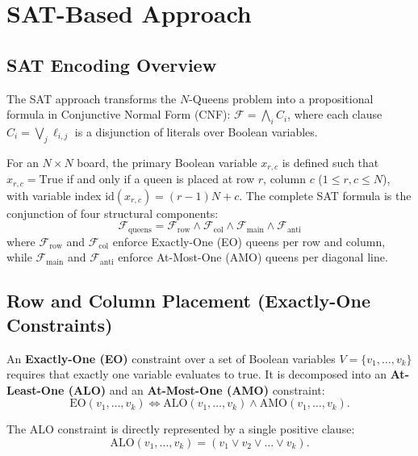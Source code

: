 \documentclass[a4paper,fleqn]{cas-sc}
\begin{document}
\section{SAT-Based Approach}
\label{sec:sat_approach}

\subsection{SAT Encoding Overview}

The SAT approach transforms the $N$-Queens problem into a propositional formula in Conjunctive Normal Form (CNF): $\mathcal{F} = \bigwedge_{i} C_i$, where each clause $C_i = \bigvee_{j} \ell_{i,j}$ is a disjunction of literals over Boolean variables. 

For an $N \times N$ board, the primary Boolean variable $x_{r,c}$ is defined such that $x_{r,c} = \text{True}$ if and only if a queen is placed at row $r$, column $c$ ($1 \le r, c \le N$), with variable index $\text{id}(x_{r,c}) = (r-1)N + c$. The complete SAT formula is the conjunction of four structural components:
\begin{equation}
    \mathcal{F}_{\text{queens}} = \mathcal{F}_{\text{row}} \wedge \mathcal{F}_{\text{col}} \wedge \mathcal{F}_{\text{main}} \wedge \mathcal{F}_{\text{anti}}
    \label{eq:sat_formula}
\end{equation}
where $\mathcal{F}_{\text{row}}$ and $\mathcal{F}_{\text{col}}$ enforce Exactly-One (EO) queens per row and column, while $\mathcal{F}_{\text{main}}$ and $\mathcal{F}_{\text{anti}}$ enforce At-Most-One (AMO) queens per diagonal line.

\subsection{Row and Column Placement (Exactly-One Constraints)}

An \textbf{Exactly-One (EO)} constraint over a set of Boolean variables $V = \{v_1, \ldots, v_k\}$ requires that exactly one variable evaluates to true. It is decomposed into an \textbf{At-Least-One (ALO)} and an \textbf{At-Most-One (AMO)} constraint:
\begin{equation}
    \text{EO}(v_1, \ldots, v_k) \iff \text{ALO}(v_1, \ldots, v_k) \wedge \text{AMO}(v_1, \ldots, v_k).
\end{equation}

The ALO constraint is directly represented by a single positive clause:
\begin{equation}
    \text{ALO}(v_1, \ldots, v_k) = (v_1 \vee v_2 \vee \dots \vee v_k).
\end{equation}
\end{document}
